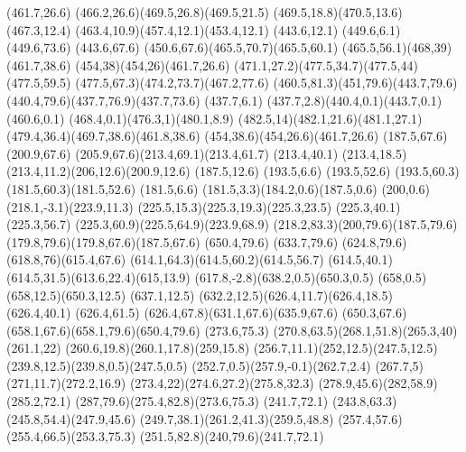{
{
\newpath
\moveto(461.7,26.6)
\curveto(466.2,26.6)(469.5,26.8)(469.5,21.5)
\curveto(469.5,18.8)(470.5,13.6)(467.3,12.4)
\curveto(463.4,10.9)(457.4,12.1)(453.4,12.1)
\lineto(443.6,12.1)
\lineto(449.6,6.1)
\lineto(449.6,73.6)
\lineto(443.6,67.6)
\curveto(450.6,67.6)(465.5,70.7)(465.5,60.1)
\curveto(465.5,56.1)(468,39)(461.7,38.6)
\curveto(454,38)(454,26)(461.7,26.6)
\curveto(471.1,27.2)(477.5,34.7)(477.5,44)
\lineto(477.5,59.5)
\curveto(477.5,67.3)(474.2,73.7)(467.2,77.6)
\curveto(460.5,81.3)(451,79.6)(443.7,79.6)
\curveto(440.4,79.6)(437.7,76.9)(437.7,73.6)
\lineto(437.7,6.1)
\curveto(437.7,2.8)(440.4,0.1)(443.7,0.1)
\lineto(460.6,0.1)
\curveto(468.4,0.1)(476.3,1)(480.1,8.9)
\curveto(482.5,14)(482.1,21.6)(481.1,27.1)
\curveto(479.4,36.4)(469.7,38.6)(461.8,38.6)
\curveto(454,38.6)(454,26.6)(461.7,26.6)
}
}
{
{
\newpath
\moveto(187.5,67.6)
\lineto(200.9,67.6)
\curveto(205.9,67.6)(213.4,69.1)(213.4,61.7)
\lineto(213.4,40.1)
\lineto(213.4,18.5)
\curveto(213.4,11.2)(206,12.6)(200.9,12.6)
\lineto(187.5,12.6)
\lineto(193.5,6.6)
\lineto(193.5,52.6)
\curveto(193.5,60.3)(181.5,60.3)(181.5,52.6)
\lineto(181.5,6.6)
\curveto(181.5,3.3)(184.2,0.6)(187.5,0.6)
\curveto(200,0.6)(218.1,-3.1)(223.9,11.3)
\curveto(225.5,15.3)(225.3,19.3)(225.3,23.5)
\lineto(225.3,40.1)
\lineto(225.3,56.7)
\curveto(225.3,60.9)(225.5,64.9)(223.9,68.9)
\curveto(218.2,83.3)(200,79.6)(187.5,79.6)
\curveto(179.8,79.6)(179.8,67.6)(187.5,67.6)
}
}
{
{
\newpath
\moveto(650.4,79.6)
\lineto(633.7,79.6)
\curveto(624.8,79.6)(618.8,76)(615.4,67.6)
\curveto(614.1,64.3)(614.5,60.2)(614.5,56.7)
\lineto(614.5,40.1)
\curveto(614.5,31.5)(613.6,22.4)(615,13.9)
\curveto(617.8,-2.8)(638.2,0.5)(650.3,0.5)
\curveto(658,0.5)(658,12.5)(650.3,12.5)
\lineto(637.1,12.5)
\curveto(632.2,12.5)(626.4,11.7)(626.4,18.5)
\lineto(626.4,40.1)
\lineto(626.4,61.5)
\curveto(626.4,67.8)(631.1,67.6)(635.9,67.6)
\lineto(650.3,67.6)
\curveto(658.1,67.6)(658.1,79.6)(650.4,79.6)
}
}
{
{
\newpath
\moveto(273.6,75.3)
\curveto(270.8,63.5)(268.1,51.8)(265.3,40)
\lineto(261.1,22)
\curveto(260.6,19.8)(260.1,17.8)(259,15.8)
\curveto(256.7,11.1)(252,12.5)(247.5,12.5)
\curveto(239.8,12.5)(239.8,0.5)(247.5,0.5)
\curveto(252.7,0.5)(257.9,-0.1)(262.7,2.4)
\curveto(267.7,5)(271,11.7)(272.2,16.9)
\curveto(273.4,22)(274.6,27.2)(275.8,32.3)
\curveto(278.9,45.6)(282,58.9)(285.2,72.1)
\curveto(287,79.6)(275.4,82.8)(273.6,75.3)
}
}
{
{
\newpath
\moveto(241.7,72.1)
\curveto(243.8,63.3)(245.8,54.4)(247.9,45.6)
\curveto(249.7,38.1)(261.2,41.3)(259.5,48.8)
\curveto(257.4,57.6)(255.4,66.5)(253.3,75.3)
\curveto(251.5,82.8)(240,79.6)(241.7,72.1)
}
}
